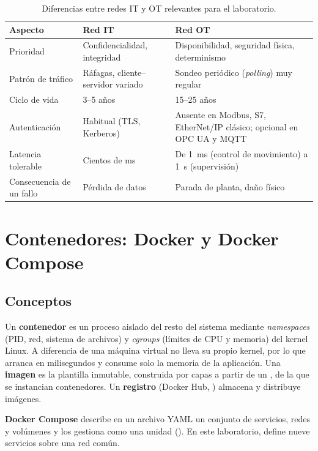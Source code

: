\begin{table}[H]
\centering\small
\caption{Diferencias entre redes IT y OT relevantes para el laboratorio.}
\label{tab:itot}
\begin{tabularx}{\textwidth}{L{3.2cm} X X}
\toprule
\textbf{Aspecto} & \textbf{Red IT} & \textbf{Red OT} \\
\midrule
Prioridad & Confidencialidad, integridad & Disponibilidad, seguridad física, determinismo \\
Patrón de tráfico & Ráfagas, cliente--servidor variado & Sondeo periódico (\emph{polling}) muy regular \\
Ciclo de vida & 3--5 años & 15--25 años \\
Autenticación & Habitual (TLS, Kerberos) & Ausente en Modbus, S7, EtherNet/IP clásico; opcional en OPC UA y MQTT \\
Latencia tolerable & Cientos de ms & De 1~ms (control de movimiento) a 1~s (supervisión) \\
Consecuencia de un fallo & Pérdida de datos & Parada de planta, daño físico \\
\bottomrule
\end{tabularx}
\end{table}

\section{Contenedores: Docker y Docker Compose}
\label{sec:docker}

\subsection{Conceptos}

Un \textbf{contenedor} es un proceso aislado del resto del sistema mediante \emph{namespaces} (PID, red, sistema de archivos) y \emph{cgroups} (límites de CPU y memoria) del kernel Linux. A diferencia de una máquina virtual no lleva su propio kernel, por lo que arranca en milisegundos y consume solo la memoria de la aplicación. Una \textbf{imagen} es la plantilla inmutable, construida por capas a partir de un , de la que se instancian contenedores. Un \textbf{registro} (Docker Hub, ) almacena y distribuye imágenes.

\textbf{Docker Compose} describe en un archivo YAML un conjunto de servicios, redes y volúmenes y los gestiona como una unidad (). En este laboratorio,  define nueve servicios sobre una red común.

